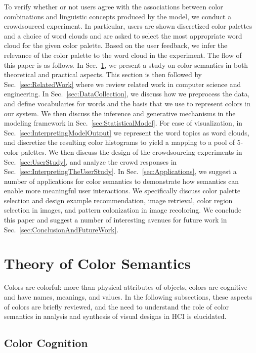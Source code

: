 \documentclass[prodmode,acmtochi]{acmsmall}
\begin{document}
To verify  whether or not users agree with the associations between color combinations and linguistic concepts produced by the model, we conduct a crowdsourced experiment. In particular, users are shown discretized color palettes and a choice of word clouds and are asked to select the most appropriate word cloud for the given color palette.  Based on the user feedback, we infer the relevance of the color palette to the word cloud in the experiment.
The flow of this paper is as follows. In Sec.~\ref{sec:Theory}, we present a study on color semantics in both theoretical and practical aspects. This section is then followed by Sec.~\ref{sec:RelatedWork} where we review related work in computer science and engineering. In Sec.~\ref{sec:DataCollection}, we discuss how we preprocess the data, and define vocabularies for words and the basis that we use to represent colors in our system. We then discuss the inference and generative mechanisms in the modeling framework in Sec.~\ref{sec:StatisticalModel}. For ease of visualization, in Sec.~\ref{sec:InterpretingModelOutput} we represent the word topics as word clouds, and discretize the resulting color histograms to yield a mapping to a pool of 5-color palettes. We then discuss the design of the crowdsourcing experiments in Sec.~\ref{sec:UserStudy}, and analyze the crowd responses in Sec.~\ref{sec:InterpretingTheUserStudy}. In Sec.~\ref{sec:Applications}, we suggest a number of applications for color semantics to demonstrate how semantics can enable more meaningful user interactions.
We specifically discuss color palette selection and design example recommendation, image retrieval, color region selection in images, and pattern colonization in image recoloring. We conclude this paper and suggest a number of interesting avenues for future work in Sec.~\ref{sec:ConclusionAndFutureWork}.


\section{Theory of Color Semantics}
\label{sec:Theory}

Colors are colorful: more than physical attributes of objects, colors are cognitive and have names, meanings, and values. In the following subsections, these aspects of colors are briefly reviewed, and the need to understand the role of color semantics in analysis and synthesis of visual designs in HCI is elucidated.

\subsection{Color Cognition}
\end{document}
